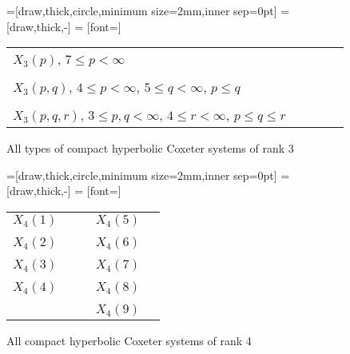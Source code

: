 \begin{figure}
	\centering
	=[draw,thick,circle,minimum size=2mm,inner sep=0pt]
	 = [draw,thick,-]
	 = [font=\small]

	\begin{tabular}{MMcMM}
		$X_3(p)$, {\tiny $7 \leq p < \infty$} & \comphyperthreeone \\ \vspace*{\cgpadv} \\
		$X_3(p,q)$, {\tiny $4 \leq p < \infty$, $5 \leq q < \infty$, $p \leq q$} & \comphyperthreetwo \\ \vspace*{\cgpadv} \\
		$X_3(p,q,r)$, {\tiny $3 \leq p,q < \infty$, $4 \leq r < \infty$, $p \leq q \leq r$} & \comphyperthreethree
	\end{tabular}
	\caption{All types of compact hyperbolic Coxeter systems of rank 3}
	\label{fig:compact-hyperbolic-coxeter-systems-3}
\end{figure}

\begin{figure}
	\centering
	=[draw,thick,circle,minimum size=2mm,inner sep=0pt]
	 = [draw,thick,-]
	 = [font=\small]

	\begin{tabular}{MMcMM}
		$X_4(1)$ & \comphyperfourlineone & \hspace*{\cgpadh} & $X_4(5)$ & \comphyperfoursquareone \\ \vspace*{\cgpadv} \\
		$X_4(2)$ & \comphyperfourlinetwo & \hspace*{\cgpadh} & $X_4(6)$ & \comphyperfoursquaretwo \\ \vspace*{\cgpadv} \\
		$X_4(3)$ & \comphyperfourlinethree & \hspace*{\cgpadh} & $X_4(7)$ & \comphyperfoursquarethree \\ \vspace*{\cgpadv} \\
		$X_4(4)$ & \comphyperfourlinefour & \hspace*{\cgpadh} & $X_4(8)$ & \comphyperfoursquarefour \\ \vspace*{\cgpadv} \\
		& & & $X_4(9)$ & \comphyperfoursquarefive
	\end{tabular}
	\caption{All compact hyperbolic Coxeter systems of rank 4}
	\label{fig:compact-hyperbolic-coxeter-systems-4}
\end{figure}

